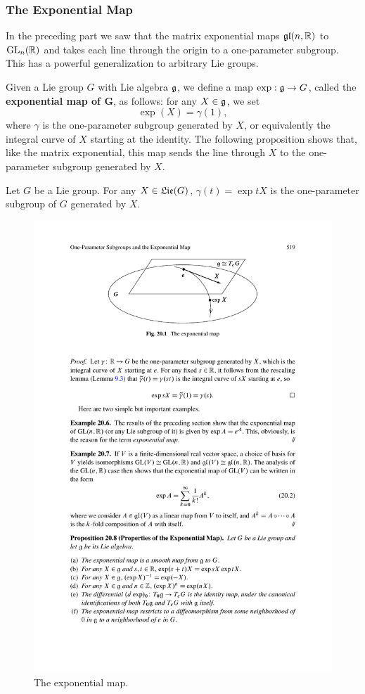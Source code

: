 \subsubsection{The Exponential Map}
In the preceding part we saw that the matrix exponential maps $\mathfrak{gl}(n,\mathbb{R})$ to $\mathrm{GL}_n(\mathbb{R})$ and takes each line through the origin to a one-parameter subgroup. This
has a powerful generalization to arbitrary Lie groups.\par
Given a Lie group $G$ with Lie algebra $\mathfrak{g}$, we define a map $\exp:\mathfrak{g}\to G$, called the \textbf{exponential map of $\bm{G}$}, as follows: for any $X\in\mathfrak{g}$, we set
\[\exp(X)=\gamma(1),\]
where $\gamma$ is the one-parameter subgroup generated by $X$, or equivalently the integral curve of $X$ starting at the identity. The following proposition shows that,
like the matrix exponential, this map sends the line through $X$ to the one-parameter
subgroup generated by $X$.
\begin{proposition}\label{exp map one-para}
Let $G$ be a Lie group. For any $X\in\mathfrak{Lie}(G)$, $\gamma(t)=\exp tX$ is the one-parameter subgroup of $G$ generated by $X$.
\end{proposition}
\begin{figure}[htbp]
\centering
\includegraphics{pictures/exp-map}
\caption{The exponential map.}
\end{figure}
